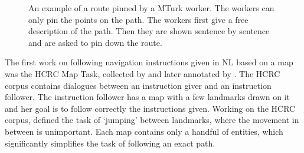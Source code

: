 \documentclass[11pt,a4paper]{article}
\begin{document}
\begin{figure}[t]
\centering
{}
\caption 
        {An example of a route pinned by a MTurk worker. The workers can only pin the points on the path. The workers first give a free description of the path. Then they are shown sentence by sentence and are asked to pin down the route.} 
        
\label{fig:user_interface}
\end{figure}

 \begin{table*}[ht]
 
     \centering
     \caption{Quantitative Comparison of the OSS to the HCRC, SAIL, and TTW Data-Sets. * We calculate over three maps randomly chosen.}
     \label{table:statistic_maps}
     
 \end{table*}
 

The first work on following navigation instructions given in NL based on a map was the HCRC Map Task, collected by \citet{anderson1991hcrc} and later annotated by \citet{levit2007interpretation}. The HCRC   corpus  contains dialogues between an instruction giver and an instruction follower. The instruction follower has a map with a few landmarks drawn on it and her goal is to follow correctly the instructions given. Working on the HCRC corpus, \citet{vogel2010learning} defined the task of \enquote*{jumping} between landmarks, where the movement in between is unimportant. Each map contains only a handful of entities, which  significantly simplifies  the task of following an exact path.  
\end{document}
